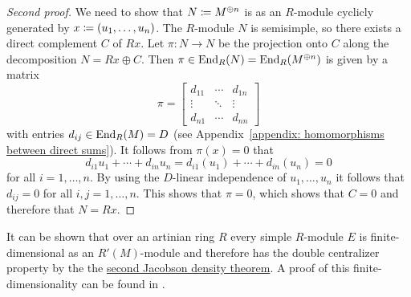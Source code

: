 \begin{proof}[Second proof]
  We need to show that $N \coloneqq M^{\oplus n}$ is as an $R$-module cyclicly generated by $x \coloneqq (u_1, \dotsc, u_n)$.
  The $R$-module $N$ is semisimple, so there exists a direct complement $C$ of $Rx$.
  Let $\pi \colon N \to N$ be the projection onto $C$ along the decomposition $N = Rx \oplus C$.
  Then $\pi \in \operatorname{End}_R(N) = \operatorname{End}_R(M^{\oplus n})$ is given by a matrix
  \[
      \pi
    = \begin{bmatrix}
        d_{11}  & \cdots  & d_{1n}  \\
        \vdots  & \ddots  & \vdots  \\
        d_{n1}  & \cdots  & d_{nn}
      \end{bmatrix}
  \]
  with entries $d_{ij} \in \operatorname{End}_R(M) = D$ (see Appendix~\ref{appendix: homomorphisms between direct sums}).
  It follows from $\pi(x) = 0$ that
  \[
      d_{i1} u_1 + \dotsb + d_{in} u_n
    = d_{i1}(u_1) + \dotsb + d_{in}(u_n)
    = 0
  \]
  for all $i = 1, \dotsc, n$.
  By using the $D$-linear independence of $u_1, \dotsc, u_n$ it follows that $d_{ij} = 0$ for all $i, j = 1, \dotsc, n$.
  This shows that $\pi = 0$, which shows that $C = 0$ and therefore that $N = Rx$.
\end{proof}




\begin{remark}
  It can be shown that over an artinian ring $R$ every simple $R$-module $E$ is finite-dimensional as an $R'(M)$-module and therefore has the double centralizer property by the the \hyperref[theorem: second jacobson density theorem]{second Jacobson density theorem}.
  A proof of this finite-dimensionality can be found in \cite[Lemma~13.17]{Isaacs2009Algebra}.
\end{remark}




